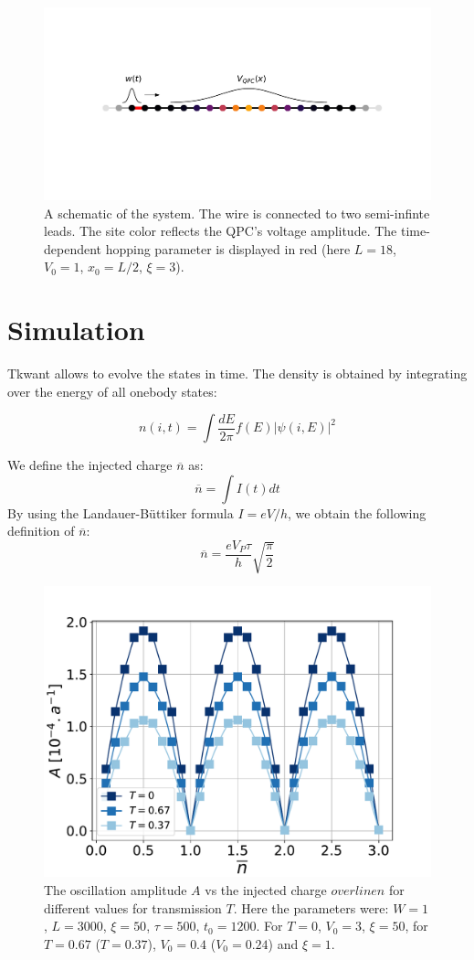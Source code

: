 \documentclass[aps,prl,preprint,groupedaddress]{revtex4-1}
\begin{document}
\begin{figure}[h]
	\centering
	\includegraphics[trim=0cm 5cm 0cm 5cm, width = 0.9\linewidth]{../figures/syst_color_textv2}
	\caption{A schematic of the system. The wire is connected to two semi-infinte leads. The site color reflects the QPC's voltage amplitude. The time-dependent hopping parameter is displayed in red (here $L = 18$, $V_0 = 1$, $x_0 = L/2$, $\xi = 3$).}
	\label{fig:systcolor}
\end{figure}
\section{Simulation}
%
 Tkwant allows to evolve the states in time. The density is obtained by integrating over the energy of all onebody states:
 
 \begin{equation}
 n(i,t) = \int \frac{dE}{2\pi} f(E) |\psi(i,E)|^2
 \end{equation}
 
 We define the injected charge $\overline{n}$ as:
 \begin{equation}
 	\overline{n} = \int I(t)dt
 \end{equation}
 By using the Landauer-Büttiker formula $I = eV/h$, we obtain the following definition of $\overline{n}$:
 \begin{equation}
 	\overline{n} = \frac{eV_P\tau}{h}\sqrt{\frac{\pi}{2}}
 \end{equation}
 \begin{figure}
 	\centering
 	\includegraphics[width=0.7\linewidth]{../figures/A_vs_nbar_vs_transm}
 	\caption{The oscillation amplitude $A$ vs the injected charge $overline{n}$ for different values for transmission $T$. Here the parameters were: $W =1$, $L = 3000$, $\xi = 50$, $\tau = 500$, $t_0 = 1200$. For $T=0$, $V_0 =3$, $\xi = 50$, for $T=0.67$ ($T=0.37$), $V_0 =0.4$ ($V_0 = 0.24$) and $\xi = 1$.}
 	\label{fig:avsnbarw1l3000v03lx50ef2}
 \end{figure}
 
\end{document}
